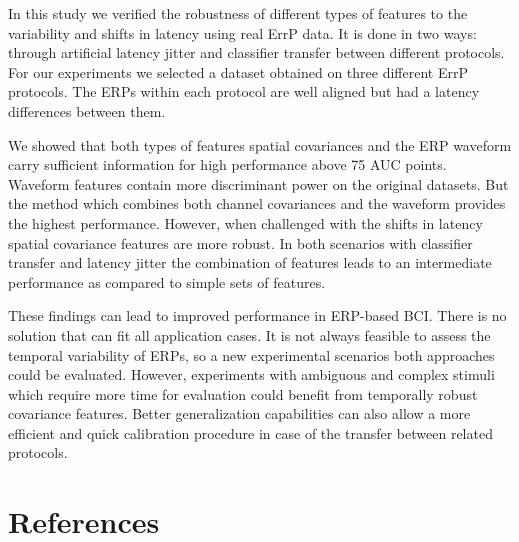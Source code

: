 \documentclass[12pt]{iopart}
\begin{document}
In this study we verified the robustness of different types of features
to the variability and shifts in latency using real ErrP data.
It is done in two ways: through artificial latency jitter
and classifier transfer between different protocols.
For our experiments we selected a dataset obtained on three
different ErrP protocols. The ERPs within each protocol are
well aligned but had a latency differences between them.

We showed that both types of features spatial covariances and the ERP waveform
carry sufficient information for high performance above 75 AUC points.
Waveform features contain more discriminant power on the original datasets.
But the method which combines both channel covariances and the waveform
provides the highest performance.
However, when challenged with the shifts in latency
spatial covariance features are more robust.
In both scenarios with classifier transfer and latency jitter
the combination of features leads to an intermediate
performance as compared to simple sets of features.

These findings can lead to improved performance in ERP-based BCI. 
There is no solution that can fit all application cases.
It is not always feasible to assess the temporal variability
of ERPs, so a new experimental scenarios both approaches
could be evaluated.
However, experiments with ambiguous and complex stimuli which require more time
for evaluation could benefit from temporally robust covariance features.
Better generalization capabilities can also allow a more efficient and quick
calibration procedure in case of the transfer between related protocols.


\section*{References}



\end{document}
